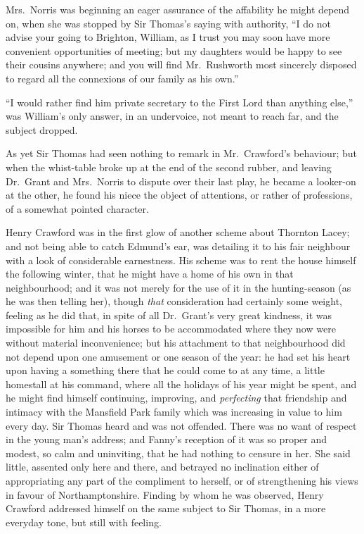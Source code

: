 Mrs.\ Norris was beginning an eager assurance of the
affability he might depend on, when she was stopped
by Sir Thomas's saying with authority, ``I do not advise
your going to Brighton, William, as I trust you may soon
have more convenient opportunities of meeting; but my
daughters would be happy to see their cousins anywhere;
and you will find Mr.\ Rushworth most sincerely disposed
to regard all the connexions of our family as his own.''

``I would rather find him private secretary to the First
Lord than anything else,'' was William's only answer,
in an undervoice, not meant to reach far, and the
subject dropped.

As yet Sir Thomas had seen nothing to remark in Mr.\ Crawford's
behaviour; but when the whist-table broke up at the end
of the second rubber, and leaving Dr.\ Grant and Mrs.\ Norris
to dispute over their last play, he became a looker-on
at the other, he found his niece the object of attentions,
or rather of professions, of a somewhat pointed character.

Henry Crawford was in the first glow of another scheme
about Thornton Lacey; and not being able to catch
Edmund's ear, was detailing it to his fair neighbour
with a look of considerable earnestness.  His scheme
was to rent the house himself the following winter,
that he might have a home of his own in that neighbourhood;
and it was not merely for the use of it in the hunting-season
(as he was then telling her), though \emph{that} consideration
had certainly some weight, feeling as he did that,
in spite of all Dr.\ Grant's very great kindness, it was
impossible for him and his horses to be accommodated
where they now were without material inconvenience;
but his attachment to that neighbourhood did not depend
upon one amusement or one season of the year:  he had set
his heart upon having a something there that he could
come to at any time, a little homestall at his command,
where all the holidays of his year might be spent, and he
might find himself continuing, improving, and \emph{perfecting}
that friendship and intimacy with the Mansfield Park
family which was increasing in value to him every day.
Sir Thomas heard and was not offended.  There was no want
of respect in the young man's address; and Fanny's reception
of it was so proper and modest, so calm and uninviting,
that he had nothing to censure in her.  She said little,
assented only here and there, and betrayed no inclination
either of appropriating any part of the compliment to herself,
or of strengthening his views in favour of Northamptonshire.
Finding by whom he was observed, Henry Crawford addressed
himself on the same subject to Sir Thomas, in a more
everyday tone, but still with feeling.

